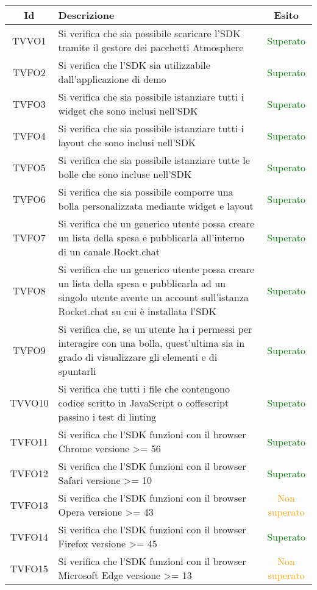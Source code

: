 \begin{center}
	\begin{longtable}{|c|>{\centering}m{10cm}|c|}\hline
		Id & Descrizione & Esito\\ \hline
		TVVO1 & Si verifica che sia possibile scaricare l'SDK tramite il gestore dei pacchetti Atmosphere & \textcolor{Green}{Superato}\\ \hline
		TVFO2 & Si verifica che l'SDK sia utilizzabile dall'applicazione di demo & \textcolor{Green}{Superato}\\ \hline
		TVFO3 & Si verifica che sia possibile istanziare tutti i widget che sono inclusi nell'SDK & \textcolor{Green}{Superato}\\ \hline
		TVFO4 & Si verifica che sia possibile istanziare tutti i layout che sono inclusi nell'SDK & \textcolor{Green}{Superato}\\ \hline
		TVFO5 & Si verifica che sia possibile istanziare tutte le bolle che sono incluse nell'SDK & \textcolor{Green}{Superato}\\ \hline
		TVFO6 & Si verifica che sia possibile comporre una bolla personalizzata mediante widget e layout & \textcolor{Green}{Superato}\\ \hline
		TVFO7 & Si verifica che un generico utente possa creare un lista della spesa e pubblicarla all'interno di un canale Rockt.chat & \textcolor{Green}{Superato}\\ \hline
		TVFO8 & Si verifica che un generico utente possa creare un lista della spesa e pubblicarla ad un singolo utente avente un account sull'istanza Rocket.chat su cui è installata l'SDK & \textcolor{Green}{Superato}\\ \hline
		TVFO9 & Si verifica che, se un utente ha i permessi per interagire con una bolla, quest'ultima sia in grado di visualizzare gli elementi e di spuntarli & \textcolor{Green}{Superato}\\ \hline
		TVVO10 & Si verifica che tutti i file che contengono codice scritto in JavaScript o coffescript passino i test di linting & \textcolor{Green}{Superato}\\ \hline
		TVFO11 & Si verifica che l'SDK funzioni con il browser Chrome versione >= 56 & \textcolor{Green}{Superato}\\ \hline
		TVFO12 & Si verifica che l'SDK funzioni con il browser Safari versione >= 10 & \textcolor{Green}{Superato}\\ \hline
		TVFO13 & Si verifica che l'SDK funzioni con il browser Opera versione >= 43 & \textcolor{Orange}{Non superato}\\ \hline
		TVFO14 & Si verifica che l'SDK funzioni con il browser Firefox versione >= 45 & \textcolor{Green}{Superato}\\ \hline
		TVFO15 & Si verifica che l'SDK funzioni con il browser Microsoft Edge versione >= 13 & \textcolor{Orange}{Non superato}\\ \hline
	\end{longtable}
\end{center}
